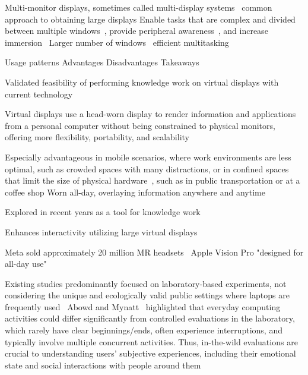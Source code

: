 Multi-monitor displays, sometimes called multi-display systems~\cite{ni2006lhdrsurvey} 
common approach to obtaining large displays
Enable tasks that are complex and divided between multiple windows~\cite{pavanatto2024multiplemonitors}, 
provide peripheral awareness~\cite{grudin2001digitalworlds},
and increase immersion~\cite{bi2009comparing} 
Larger number of windows~\cite{endert2012lhrd} 
efficient multitasking~\cite{czerwinski2003largedisplays}

Usage patterns 
Advantages
Disadvantages 
Takeaways 


Validated feasibility of performing knowledge work on virtual displays with current technology~\cite{pavanatto2024xrwild}

Virtual displays use a head-worn display to render information and applications from a personal computer without being constrained to physical monitors, offering more flexibility, portability, and scalability~\cite{pavanatto2024xrwild} %

Especially advantageous in mobile scenarios, where work environments are less optimal, such as crowded spaces with many distractions, or in confined spaces that limit the size of physical hardware~\cite{biener2024xrworkpublic}, such as in public transportation or at a coffee shop  
Worn all-day, overlaying information anywhere and anytime~\cite{lu2020glanceable,grubert2017pervasive}

Explored in recent years as a tool for knowledge work~\cite{biener2024holdtight,biener2022povrpoint,biener2020breakingscreen,ruvimova2020transportaway} %

Enhances interactivity \cite{biener2022povrpoint}
utilizing large virtual displays \cite{biener2020breakingscreen,mcgill2020seatedvrworkspace} 

Meta sold approximately 20 million MR headsets~\cite{lang2023meta}
Apple Vision Pro "designed for all-day use" ~\cite{apple2023introducingvp} 

Existing studies predominantly focused on laboratory-based experiments, not considering the unique and ecologically valid public settings where laptops are frequently used~\cite{pavanatto2024xrwild}
Abowd and Mynatt~\cite{abowd2000chartingubicomp,pavanatto2024xrwild} highlighted that everyday computing activities could differ significantly from controlled evaluations in the
laboratory, which rarely have clear beginnings/ends, often experience
interruptions, and typically involve multiple concurrent activities. Thus,
in-the-wild evaluations are crucial to understanding users’ subjective
experiences, including their emotional state and social interactions with
people around them

